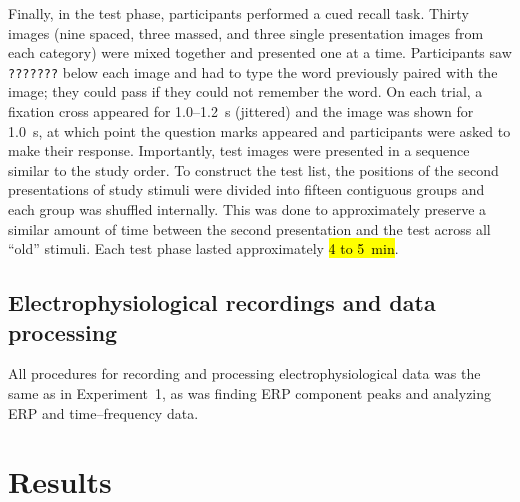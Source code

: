 
Finally, in the test phase, participants performed a cued recall task.  Thirty images (nine spaced, three massed, and three single presentation images from each category) were mixed together and presented one at a time.  Participants saw \texttt{???????} below each image and had to type the word previously paired with the image; they could pass if they could not remember the word.  On each trial, a fixation cross appeared for 1.0--1.2~s (jittered) and the image was shown for 1.0~s, at which point the question marks appeared and participants were asked to make their response.  Importantly, test images were presented in a sequence similar to the study order.  To construct the test list, the positions of the second presentations of study stimuli were divided into fifteen contiguous groups and each group was shuffled internally.  This was done to approximately preserve a similar amount of time between the second presentation and the test across all ``old'' stimuli.  Each test phase lasted approximately \hl{4 to 5~min}.



\subsection{Electrophysiological recordings and data processing}

All procedures for recording and processing electrophysiological data was the same as in Experiment~1, as was finding ERP component peaks and analyzing ERP and time--frequency data.

\section{Results}



